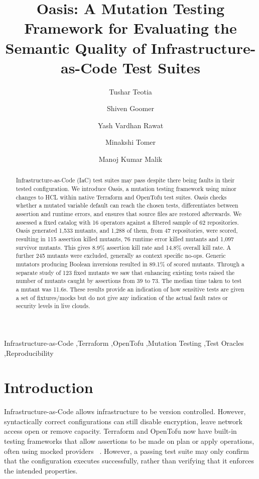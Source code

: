 \documentclass[3p,times,procedia]{elsarticle}
\begin{document}
\begin{frontmatter}
\title{Oasis: A Mutation Testing Framework for Evaluating the Semantic Quality of Infrastructure-as-Code Test Suites}
\author[a]{Tushar Teotia}
\author[a]{Shiven Goomer}
\author[a]{Yash Vardhan Rawat}
\author[a]{Minakshi Tomer}
\author[a]{Manoj Kumar Malik}
\address[a]{Department of Information Technology, Maharaja Surajmal Institute of Technology, Janakpuri, New Delhi 110058, India}
\begin{abstract}
Infrastructure-as-Code (IaC) test suites may pass despite there being faults in their tested configuration. We introduce Oasis, a
mutation testing framework using minor changes to HCL within native Terraform and OpenTofu test suites. Oasis checks whether a
mutated variable default can reach the chosen tests, differentiates between assertion and runtime errors,
and ensures that source files are restored afterwards. We assessed a fixed catalog with 16 operators against a filtered sample of 62
repositories. Oasis generated 1,533 mutants, and 1,288 of them, from 47 repositories, were scored, resulting in 115 assertion killed
mutants, 76 runtime error killed mutants and 1,097 survivor mutants. This gives 8.9\% assertion kill rate and 14.8\% overall kill
rate. A further 245 mutants were excluded, generally as context specific no-ops. Generic mutators producing Boolean inversions resulted
in 89.1\% of scored mutants. Through a separate study of 123 fixed mutants we saw that enhancing existing tests raised the
number of mutants caught by assertions from 39 to 73. The median time taken to test a mutant was 11.6s. These results provide
an indication of how sensitive tests are given a set of fixtures/mocks but do not give any indication of the actual fault rates or
security levels in live clouds.



\end{abstract}
\begin{keyword}
Infrastructure-as-Code \sep Terraform \sep OpenTofu \sep Mutation Testing \sep Test Oracles \sep Reproducibility
\end{keyword}
\end{frontmatter}

\section{Introduction}\label{sec:introduction}
Infrastructure-as-Code allows infrastructure to be version controlled. However, syntactically correct configurations can still disable encryption, leave network access open or remove capacity. Terraform and OpenTofu now have built-in testing frameworks that allow assertions to be made on plan or apply operations, often using mocked providers
~\cite{terraformtests,tofutests,mocks}. However, a passing test suite may only confirm that the configuration executes successfully, rather than verifying that it enforces the intended properties.
\end{document}
